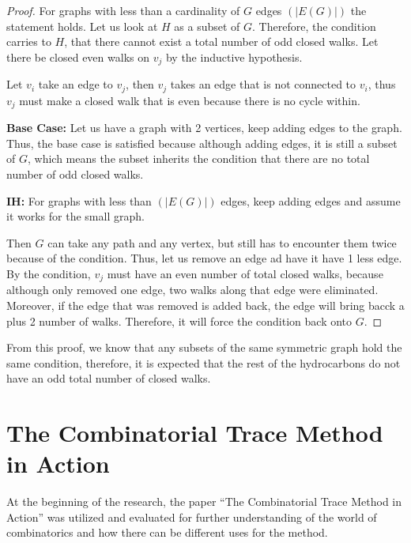 \begin{proof}
    For graphs with less than a cardinality of $G$ edges $(|E(G)|)$ the statement holds.
    Let us look at $H$ as a subset of $G$.  Therefore, the condition carries to $H$, that there cannot exist a total number of odd closed walks.  Let there be closed even walks on $v_{j}$ by the inductive hypothesis. 
    \par
    Let $v_{i}$ take an edge to $v_{j}$, then $v_{j}$ takes an edge that is not connected to $v_{i}$, thus $v_{j}$ must make a closed walk that is even because there is no cycle within. \\
    \par 
    \textbf{Base Case:} Let us have a graph with 2 vertices, keep adding edges to the graph.  Thus, the base case is satisfied because although adding edges, it is still a subset of $G$, which means the subset inherits the condition that there are no total number of odd closed walks. \\
    \begin{center}
        \textbf{IH:} For graphs with less than $(|E(G)|)$ edges, keep adding edges and assume it works for the small graph. 
    \end{center}
    
    \par
    Then $G$ can take any path and any vertex, but still has to encounter them twice because of the condition. Thus, let us remove an edge ad have it have 1 less edge.  By the condition, $v_{j}$ must have an even number of total closed walks, because although only removed one edge, two walks along that edge were eliminated.  Moreover, if the edge that was removed is added back, the edge will bring bacck a plus 2 number of walks.  Therefore, it will force the condition back onto $G$.
\end{proof}

From this proof, we know that any subsets of the same symmetric graph hold the same condition, therefore, it is expected that the rest of the hydrocarbons do not have an odd total number of closed walks. 

\section{The Combinatorial Trace Method in Action}
At the beginning of the research, the paper ``The Combinatorial Trace Method in Action'' was utilized and evaluated for further understanding of the world of combinatorics and how there can be different uses for the method. 

